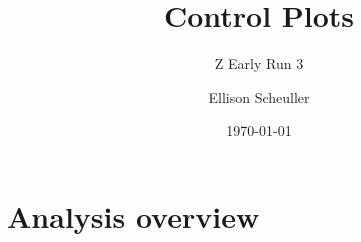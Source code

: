 \documentclass[en,16:9,navbarinfooter]{presentation/sdqbeamer}
\title{Control Plots}
\subtitle{Z Early Run 3}
\author[Ellison Scheuller]{Ellison Scheuller}
\date[\today]{\today}
\begin{document}
\KITtitleframe


\section{Analysis overview}


%
%	
%
\end{document}

